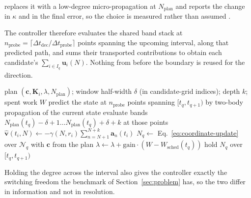  replaces it with a low-degree micro-propagation at
$N_{\mathrm{plan}}$ and reports the change in $\kappa$ and in the final error,
so the choice is measured rather than assumed .

The controller therefore evaluates the shared band stack at
$n_{\mathrm{probe}}=\lceil\Delta t_{\mathrm{dec}}/\Delta t_{\mathrm{probe}}\rceil$
points spanning the upcoming interval, along that predicted path, and sums
their transported contributions to obtain each candidate's
$\sum_{i\in I_q}\mathbf u_i(N)$. Nothing from before the boundary is reused for
the direction.

\begin{algorithm}[!htbp]
\caption{Online decision at boundary $t_q$}
\label{alg:online}
\begin{algorithmic}[1]
\Require plan $(\mathbf c,\mathbf K_i,\lambda,N_{\mathrm{plan}})$; window half-width
  $\delta$ (in candidate-grid indices); depth $k$; spent work $W$
\State predict the state at $n_{\mathrm{probe}}$ points spanning
  $[t_q,t_{q+1})$ by two-body propagation of the current state
\State evaluate bands $N_{\mathrm{plan}}(t_q)-\delta+1 \dots
  N_{\mathrm{plan}}(t_q)+\delta+k$ at those points 
  \State $\hat{\mathbf v}(t_i,N) \gets -\gamma(N,r_i)\sum_{n=N+1}^{N+k}
    \mathbf a_n(t_i)$ 
\EndFor
\State $N_q \gets$ Eq.~\eqref{eq:coordinate-update} over $\mathcal{N}_q$ with
  $\mathbf c$ from the plan
\State $\lambda \gets \lambda + \mathrm{gain}\cdot(W - W_{\mathrm{sched}}(t_q))$
\State hold $N_q$ over $[t_q,t_{q+1})$
\end{algorithmic}
\end{algorithm}

Holding the degree across the interval also gives the controller exactly the
switching freedom the benchmark of Section~\ref{sec:problem} has, so the two
differ in information and not in resolution.


